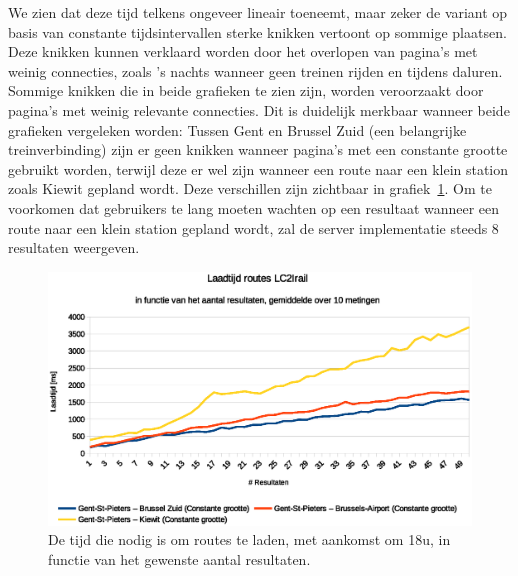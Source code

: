 We zien dat deze tijd telkens ongeveer lineair toeneemt, maar zeker de variant op basis van constante tijdsintervallen sterke knikken vertoont op sommige plaatsen. Deze knikken kunnen verklaard worden door het overlopen van pagina's met weinig connecties, zoals 's nachts wanneer geen treinen rijden en tijdens daluren. Sommige knikken die in beide grafieken te zien zijn, worden veroorzaakt door pagina's met weinig relevante connecties. Dit is duidelijk merkbaar wanneer beide grafieken vergeleken worden: Tussen Gent en Brussel Zuid (een belangrijke treinverbinding) zijn er geen knikken wanneer pagina's met een constante grootte gebruikt worden, terwijl deze er wel zijn wanneer een route naar een klein station zoals Kiewit gepland wordt. Deze verschillen zijn zichtbaar in grafiek~\ref{fig:responsetimeperresultsroute}. Om te voorkomen dat gebruikers te lang moeten wachten op een resultaat wanneer een route naar een klein station gepland wordt, zal de server implementatie steeds 8 resultaten weergeven.

\begin{figure}[h]
	\centering
	\includegraphics[width=1.00\textwidth]{images/Laadtijd_routes.eps}
	\caption[Laadtijd routes in functie van aantal resultaten]{De tijd die nodig is om routes te laden, met aankomst om 18u, in functie van het gewenste aantal resultaten.}
	\label{fig:responsetimeperresultsroute}
\end{figure}

